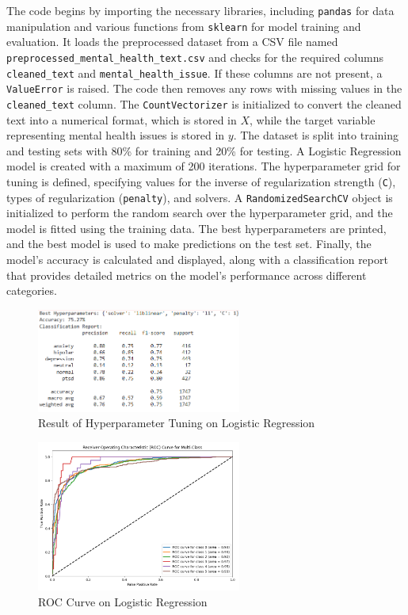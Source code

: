 \noindent
The code begins by importing the necessary libraries, including \texttt{pandas} for data manipulation and various functions from \texttt{sklearn} for model training and evaluation. It loads the preprocessed dataset from a CSV file named \newline \texttt{preprocessed\_mental\_health\_text.csv} and checks for the required columns \texttt{cleaned\_text} and \texttt{mental\_health\_issue}. If these columns are not present, a \texttt{ValueError} is raised. The code then removes any rows with missing values in the \texttt{cleaned\_text} column. The \texttt{CountVectorizer} is initialized to convert the cleaned text into a numerical format, which is stored in \(X\), while the target variable representing mental health issues is stored in \(y\). The dataset is split into training and testing sets with 80\% for training and 20\% for testing. A Logistic Regression model is created with a maximum of 200 iterations. The hyperparameter grid for tuning is defined, specifying values for the inverse of regularization strength (\texttt{C}), types of regularization (\texttt{penalty}), and solvers. A \texttt{RandomizedSearchCV} object is initialized to perform the random search over the hyperparameter grid, and the model is fitted using the training data. The best hyperparameters are printed, and the best model is used to make predictions on the test set. Finally, the model's accuracy is calculated and displayed, along with a classification report that provides detailed metrics on the model's performance across different categories.

\begin{figure}[h!]  
    \centering
    \includegraphics[width=0.6\textwidth]{Images/Output HPT LR.png}  
    \caption{Result of Hyperparameter Tuning on Logistic Regression}
    \label{Project Modules}  %
\end{figure}

\begin{figure}[h!]  
    \centering
    \includegraphics[width=0.6\textwidth]{Images/ROC LR.png}  
    \caption{ROC Curve on Logistic Regression}
    \label{ROC LR}  %
\end{figure}


